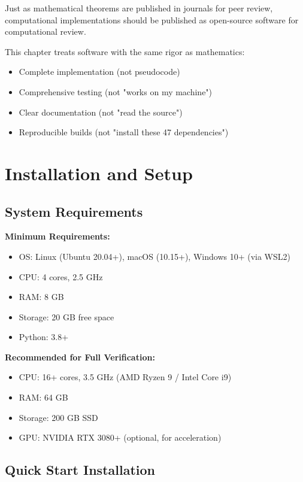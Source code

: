 \begin{keyidea}
Just as mathematical theorems are published in journals for peer review, computational implementations should be published as open-source software for computational review.

This chapter treats software with the same rigor as mathematics:
\begin{itemize}
\item Complete implementation (not pseudocode)
\item Comprehensive testing (not "works on my machine")
\item Clear documentation (not "read the source")
\item Reproducible builds (not "install these 47 dependencies")
\end{itemize}
\end{keyidea}

\section{Installation and Setup}
\label{sec:installation}

\subsection{System Requirements}

\textbf{Minimum Requirements:}
\begin{itemize}
\item OS: Linux (Ubuntu 20.04+), macOS (10.15+), Windows 10+ (via WSL2)
\item CPU: 4 cores, 2.5 GHz
\item RAM: 8 GB
\item Storage: 20 GB free space
\item Python: 3.8+
\end{itemize}

\textbf{Recommended for Full Verification:}
\begin{itemize}
\item CPU: 16+ cores, 3.5 GHz (AMD Ryzen 9 / Intel Core i9)
\item RAM: 64 GB
\item Storage: 200 GB SSD
\item GPU: NVIDIA RTX 3080+ (optional, for acceleration)
\end{itemize}

\subsection{Quick Start Installation}

